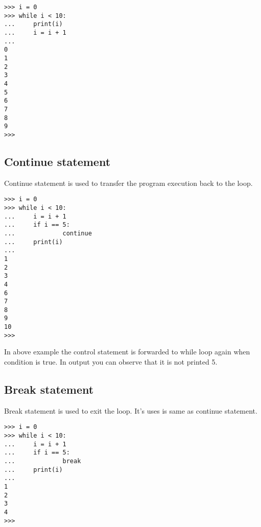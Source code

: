\documentclass[letterpaper,12pt]{book}
\begin{document}
\begin{verbatim}
>>> i = 0
>>> while i < 10:
...     print(i)
...     i = i + 1
... 
0
1
2
3
4
5
6
7
8
9
>>> 
\end{verbatim}

\subsection{Continue statement}
Continue statement is used to transfer the program execution back to the loop.

\begin{verbatim}
>>> i = 0
>>> while i < 10:
...     i = i + 1
...     if i == 5:
...             continue
...     print(i)
... 
1
2
3
4
6
7
8
9
10
>>> 
\end{verbatim}
In above example the control statement is forwarded to while loop again when condition is true. In output you can observe that it is not printed 5.

\subsection{Break statement}
Break statement is used to exit the loop. It's uses is same as continue statement.
\begin{verbatim}
>>> i = 0
>>> while i < 10:
...     i = i + 1
...     if i == 5:
...             break
...     print(i)
... 
1
2
3
4
>>> 
\end{verbatim}
\end{document}
